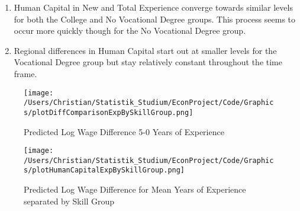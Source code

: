 \documentclass{article}
\begin{document}
\begin{enumerate}
	\item Human Capital in New and Total Experience converge towards similar levels for both the College and No Vocational Degree groups. This process seems to occur more quickly though for the No Vocational Degree group.
	\item Regional differences in Human Capital start out at smaller levels for the Vocational Degree group but stay relatively constant throughout the time frame.

\end{enumerate}

\begin{figure}[!h]
    \centering
    \texttt{[image: /Users/Christian/Statistik\_Studium/EconProject/Code/Graphics/plotDiffComparisonExpBySkillGroup.png]}
    \caption{Predicted Log Wage Difference 5-0 Years of Experience}
    \label{fig:DiffComparisonExpBySkillGroup}
\end{figure}

\begin{figure}[!h]
    \centering
    \texttt{[image: /Users/Christian/Statistik\_Studium/EconProject/Code/Graphics/plotHumanCapitalExpBySkillGroup.png]}
    \caption{Predicted Log Wage Difference for Mean Years of Experience separated by Skill Group}
    \label{fig:HumanCapitalExpBySkillGroup}
\end{figure}
\FloatBarrier
\end{document}
